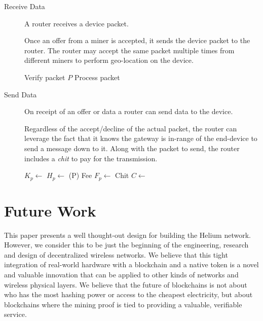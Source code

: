 \documentclass[UTF8, 10pt, nonatbib, nocopyrightspace, reprint]{sigplanconf}
\newenvironment{protocol}[2]{
  \begin{algorithm}[!htb]
    \DontPrintSemicolon
    \caption{#1}\label{#2}
}{
  \end{algorithm}
  \FloatBarrier
}
\begin{document}
\begin{description}
    \item [Receive Data] A router receives a device packet.

      Once an offer from a miner is accepted, it sends the device packet to the router. The router may accept the same packet multiple times from different miners to perform geo-location on the device.

    \begin{protocol}{Router Receive Data }{proto:router.data.recv}

       {
        Verify packet $P$ \;
        Process packet \;
      }
    \end{protocol}



    \item [Send Data] On receipt of an offer or data a router can send data to the device.

      Regardless of the accept/decline of the actual packet, the router can leverage the fact that it knows the gateway is in-range of the end-device to send a message down to it. Along with the packet to send, the router includes a \emph{chit} to pay for the transmission.

    \begin{protocol}{Router Send Data }{proto:router.data.send}

       {
        $K_p \leftarrow $  \;
        $H_p \leftarrow $ \Hash(P) \;
        Fee $F_p \leftarrow $  \;
        Chit $C \leftarrow $  \;
         \;
      }
    \end{protocol}


\end{description}

\section{Future Work}

This paper presents a well thought-out design for building the Helium network. However, we consider this to be just the beginning of the engineering, research and design of decentralized wireless networks. We believe that this tight integration of real-world hardware with a blockchain and a native token is a novel and valuable innovation that can be applied to other kinds of networks and wireless physical layers. We believe that the future of blockchains is not about who has the most hashing power or access to the cheapest electricity, but about blockchains where the mining proof is tied to providing a valuable, verifiable service.
\end{document}
